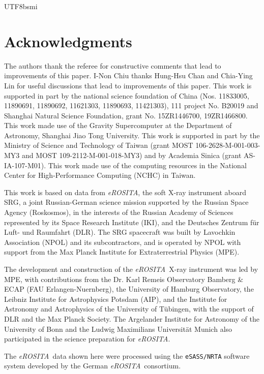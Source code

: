 \documentclass[longauth]{aa}
\newcommand{\eROSITA}{\emph{eROSITA}}
\begin{document}
\begin{CJK*}{UTF8}{bsmi}
\section*{Acknowledgments}
\label{sec:acknowledgments}



The authors thank the referee for constructive comments that lead to improvements of this paper.
I-Non Chiu thanks Hung-Hsu Chan and Chia-Ying Lin for useful discussions that lead to improvements of this paper. 
This work is supported in part by the national science foundation of China (Nos. 11833005,  11890691, 11890692, 11621303, 11890693, 11421303), 111 project No. B20019 and Shanghai Natural Science Foundation, grant No. 15ZR1446700, 19ZR1466800. 
This work made use of the Gravity Supercomputer at the Department of Astronomy, Shanghai Jiao Tong University.
This work is supported in part by the Ministry of Science and Technology of Taiwan (grant MOST 106-2628-M-001-003-MY3 and MOST
109-2112-M-001-018-MY3) and by Academia Sinica (grant AS-IA-107-M01).
This work made use of the computing resources in the National Center for High-Performance Computing (NCHC) in Taiwan.



This work is based on data from \eROSITA, the soft X-ray instrument aboard SRG, a joint Russian-German science mission supported by the Russian Space Agency (Roskosmos), in the interests of the Russian Academy of Sciences represented by its Space Research Institute (IKI), and the Deutsches Zentrum f{\"{u}}r Luft- und Raumfahrt (DLR). The SRG spacecraft was built by Lavochkin Association (NPOL) and its subcontractors, and is operated by NPOL with support from the Max Planck Institute for Extraterrestrial Physics (MPE).


The development and construction of the \eROSITA\ X-ray instrument was led by MPE, with contributions from the Dr. Karl Remeis Observatory Bamberg \& ECAP (FAU Erlangen-Nuernberg), the University of Hamburg Observatory, the Leibniz Institute for Astrophysics Potsdam (AIP), and the Institute for Astronomy and Astrophysics of the University of T{\"{u}}bingen, with the support of DLR and the Max Planck Society. The Argelander Institute for Astronomy of the University of Bonn and the Ludwig Maximilians Universit{\"{a}}t Munich also participated in the science preparation for \eROSITA.

The \eROSITA\ data shown here were processed using the \texttt{eSASS/NRTA} software system developed by the German \eROSITA\ consortium.


\end{CJK*}
\end{document}
